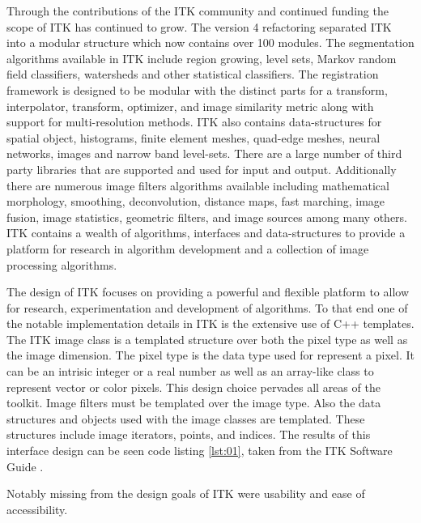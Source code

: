 \documentclass{frontiersMED} %
\begin{document}
Through the contributions of the ITK community and continued funding
the scope of ITK has continued to grow. The version 4 refactoring
separated ITK into a modular structure which now contains over 100
modules. The segmentation algorithms available in ITK include region
growing, level sets, Markov random field classifiers, watersheds and
other statistical classifiers. The registration framework is designed
to be modular with the distinct parts for a transform, interpolator,
transform, optimizer, and image similarity metric along with support
for multi-resolution methods. ITK also contains data-structures for
spatial object, histograms, finite element meshes, quad-edge meshes,
neural networks, images and narrow band level-sets. There are a large
number of third party libraries that are supported and used for input
and output. Additionally there are numerous image filters algorithms
available including mathematical morphology, smoothing, deconvolution,
distance maps, fast marching, image fusion, image statistics,
geometric filters, and image sources among many others. ITK contains a
wealth of algorithms, interfaces and data-structures to provide a
platform for research in algorithm development and a collection of
image processing algorithms.

The design of ITK focuses on providing a powerful and flexible
platform to allow for research, experimentation and development of
algorithms. To that end one of the notable implementation details in
ITK is the extensive use of C++ templates. The ITK image class is a
templated structure over both the pixel type as well as the image
dimension. The pixel type is the data type used for represent a
pixel. It can be an intrisic integer or a real number as well as an
array-like class to represent vector or color pixels. This design
choice pervades all areas of the toolkit. Image filters
must be templated over the image type. Also the data structures and objects
used with the image classes are templated. These structures
include image iterators, points, and indices. The results of this
interface design can be seen code listing \ref{lst:01}, taken from the
ITK Software Guide \cite{Ibanez2005}.



Notably missing from the design goals of ITK were usability and ease of
accessibility.
\end{document}
